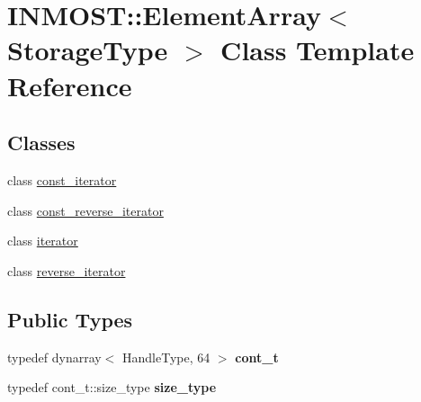 \hypertarget{classINMOST_1_1ElementArray}{\section{I\-N\-M\-O\-S\-T\-:\-:Element\-Array$<$ Storage\-Type $>$ Class Template Reference}
\label{classINMOST_1_1ElementArray}
}
\subsection*{Classes}
\begin{DoxyCompactItemize}
\item 
class \hyperlink{classINMOST_1_1ElementArray_1_1const__iterator}{const\-\_\-iterator}
\item 
class \hyperlink{classINMOST_1_1ElementArray_1_1const__reverse__iterator}{const\-\_\-reverse\-\_\-iterator}
\item 
class \hyperlink{classINMOST_1_1ElementArray_1_1iterator}{iterator}
\item 
class \hyperlink{classINMOST_1_1ElementArray_1_1reverse__iterator}{reverse\-\_\-iterator}
\end{DoxyCompactItemize}
\subsection*{Public Types}
\begin{DoxyCompactItemize}
\item 
\hypertarget{classINMOST_1_1ElementArray_a0eae35b4911aae7e9e795bc4896e3610}{typedef dynarray$<$ Handle\-Type, 64 $>$ {\bfseries cont\-\_\-t}}\label{classINMOST_1_1ElementArray_a0eae35b4911aae7e9e795bc4896e3610}

\item 
\hypertarget{classINMOST_1_1ElementArray_ab9db6ec4d56669d2b45b04e5023655dd}{typedef cont\-\_\-t\-::size\-\_\-type {\bfseries size\-\_\-type}}\label{classINMOST_1_1ElementArray_ab9db6ec4d56669d2b45b04e5023655dd}

\end{DoxyCompactItemize}
